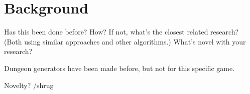 \section{Background}
\label{02}

Has this been done before? How? If not, what’s the closest related research? (Both using similar approaches and other algorithms.) What’s novel with your research?

Dungeon generators have been made before, but not for this specific game.

Novelty? /shrug